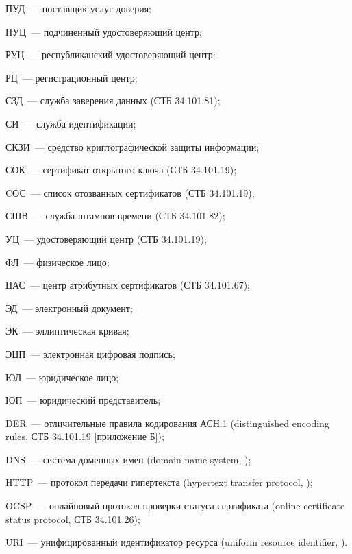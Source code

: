 ПУД~--- поставщик услуг доверия;

ПУЦ~--- подчиненный удостоверяющий центр;

РУЦ~--- республиканский удостоверяющий центр;

РЦ~--- регистрационный центр;

СЗД~--- служба заверения данных (СТБ 34.101.81);

СИ~--- служба идентификации;

СКЗИ~--- средство криптографической защиты информации;

СОК~--- сертификат открытого ключа (СТБ 34.101.19);

CОС~--- список отозванных сертификатов (СТБ 34.101.19);

СШВ~--- служба штампов времени (СТБ 34.101.82);

УЦ~--- удостоверяющий центр (СТБ 34.101.19);

ФЛ~--- физическое лицо;

ЦАС~--- центр атрибутных сертификатов (СТБ 34.101.67);

ЭД~--- электронный документ;

ЭК~--- эллиптическая кривая;

ЭЦП~--- электронная цифровая подпись;

ЮЛ~--- юридическое лицо;

ЮП~--- юридический представитель;

DER~--- отличительные правила кодирования АСН.1
(distinguished encoding rules, СТБ 34.101.19 [приложение Б]);

DNS~--- система доменных имен (domain name system, \cite{DNS});

HTTP~--- протокол передачи гипертекста 
(hypertext transfer protocol, \cite{HTTP});

OCSP~--- онлайновый протокол проверки статуса сертификата
(online certificate status protocol, СТБ 34.101.26);

URI~--- унифицированный идентификатор ресурса 
(uniform resource identifier, \cite{URI}).

